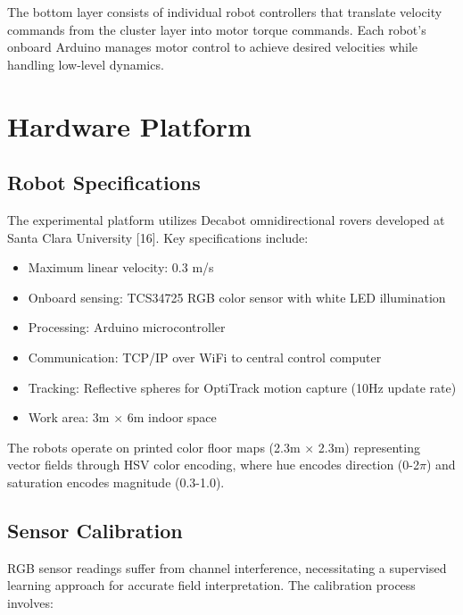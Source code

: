 \documentclass{article}
\begin{document}
The bottom layer consists of individual robot controllers that translate velocity commands from the cluster layer into motor torque commands. Each robot's onboard Arduino manages motor control to achieve desired velocities while handling low-level dynamics.

\section{Hardware Platform}

\subsection{Robot Specifications}

The experimental platform utilizes Decabot omnidirectional rovers developed at Santa Clara University [16]. Key specifications include:
\begin{itemize}
\item Maximum linear velocity: 0.3 m/s
\item Onboard sensing: TCS34725 RGB color sensor with white LED illumination
\item Processing: Arduino microcontroller
\item Communication: TCP/IP over WiFi to central control computer
\item Tracking: Reflective spheres for OptiTrack motion capture (10Hz update rate)
\item Work area: 3m $\times$ 6m indoor space
\end{itemize}

The robots operate on printed color floor maps (2.3m $\times$ 2.3m) representing vector fields through HSV color encoding, where hue encodes direction (0-2$\pi$) and saturation encodes magnitude (0.3-1.0).

\subsection{Sensor Calibration}
\label{sec:sensor-calibration}

RGB sensor readings suffer from channel interference, necessitating a supervised learning approach for accurate field interpretation. The calibration process involves:
\end{document}
